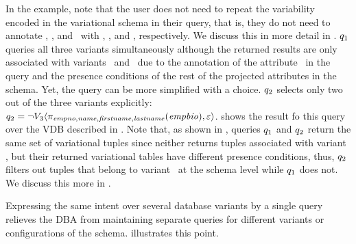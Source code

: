 In the example, note that the user does not need to repeat the variability  encoded
in the variational schema in their query, that is, they do not need to annotate \name,
\fname, and \lname\ with \vFour, \vFive, and \vFive, respectively. We discuss
this in more detail in . $\vQ_1$
queries all three variants simultaneously although the returned results are
only associated with variants \vFour\ and \vFive\ due to the annotation of the
attribute \empno\ in the query and the presence conditions of the rest of the
projected attributes in the schema.
%
Yet, the query can be more simplified with a choice. $\vQ_2$ selects only two
out of the three variants explicitly:
$\vQ_2=\chc[\neg \vThree]{\pi_{\empno,\name,\fname,\lname}(\empbio),\empRel}$. 
%
 shows the result fo this query over the VDB described in .
%
Note that, as shown in , 
queries $\vQ_1$ and $\vQ_2$ return the same set of variational tuples since
neither returns tuples associated with variant \vThree, but their returned
variational tables have different presence conditions, thus, $\vQ_2$ filters out
tuples that belong to variant \vThree\ at the schema level while $\vQ_1$ does not. We discuss this
more in . 
%


 Expressing
the same intent over several database variants by a single query relieves the DBA from
maintaining separate queries for different variants or configurations of the
schema.
illustrates this point.

